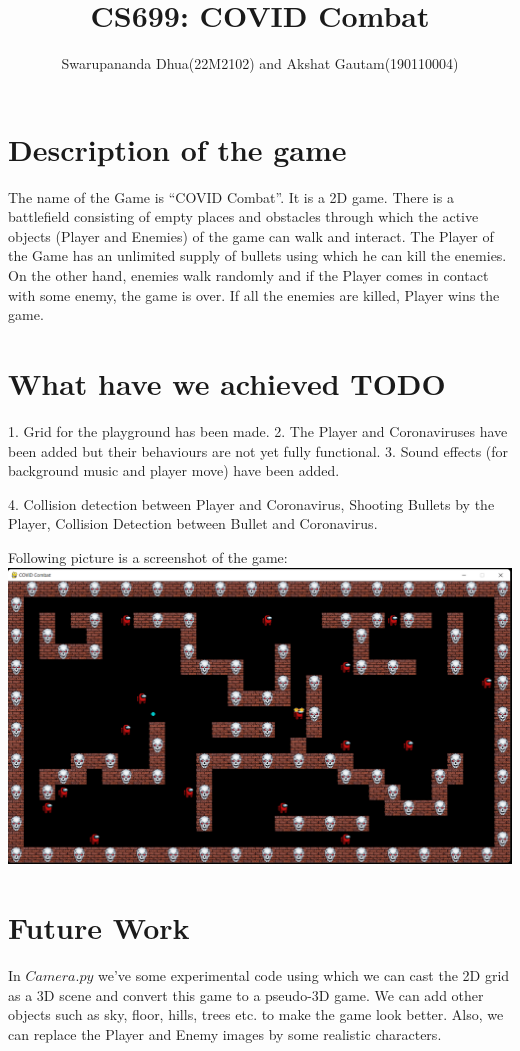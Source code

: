 \documentclass[a4paper,12pt]{report}
\title{CS699: COVID Combat}
\author{Swarupananda Dhua(22M2102) and Akshat Gautam(190110004)}
\begin{document}
\maketitle

\section{Description of the game}
The name of the Game is “COVID Combat”. It is a 2D game. There is a battlefield consisting of empty places and obstacles through which the active objects (Player and Enemies) of the game can walk and interact. The Player of the Game has an unlimited supply of bullets using which he can kill the enemies. On the other hand, enemies walk randomly and if the Player comes in contact with some enemy, the game is over. If all the enemies are killed, Player wins the game.

\section{What have we achieved TODO}
1.	Grid for the playground has been made.
2.	The Player and Coronaviruses have been added but their behaviours are not yet fully functional.
3.	Sound effects (for background music and player move) have been added.

4. Collision detection between Player and Coronavirus, Shooting Bullets by the Player, Collision Detection between Bullet and Coronavirus.

Following picture is a screenshot of the game:
\includegraphics[scale=0.4]{snapshot.png}

\section{Future Work}
In $Camera.py$ we've some experimental code using which we can cast the 2D grid as a 3D scene and convert this game to a pseudo-3D game. We can add other objects such as sky, floor, hills, trees etc. to make the game look better. Also, we can replace the Player and Enemy images by some realistic characters.
\end{document}
